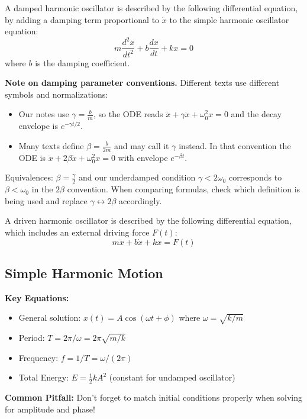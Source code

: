 \documentclass[11pt]{report}
\begin{document}
\begin{definition}
    A damped harmonic oscillator is described by the following differential equation, by adding a damping term proportional to $\dot{x}$ to the simple harmonic oscillator equation:
    \begin{equation} \label{eq:damped_ho}
        m \frac{d^2 x}{dt^2} + b \frac{dx}{dt} + kx = 0   
    \end{equation}
    where \( b \) is the damping coefficient.
\end{definition}

\begin{shaded}
	\textbf{Note on damping parameter conventions.} Different texts use different symbols and normalizations:
\begin{itemize}
    \item Our notes use $\gamma = \tfrac{b}{m}$, so the ODE reads $\ddot{x} + \gamma\dot{x} + \omega_0^2 x = 0$ and the decay envelope is $e^{-\gamma t/2}$.
    \item Many texts define $\beta = \tfrac{b}{2m}$ and may call it $\gamma$ instead. In that convention the ODE is $\ddot{x} + 2\beta\dot{x} + \omega_0^2 x = 0$ with envelope $e^{-\beta t}$.
\end{itemize}
Equivalences: $\beta = \tfrac{\gamma}{2}$ and our underdamped condition $\gamma < 2\omega_0$ corresponds to $\beta < \omega_0$ in the $2\beta$ convention. When comparing formulas, check which definition is being used and replace $\gamma \leftrightarrow 2\beta$ accordingly.
\end{shaded}

\begin{definition}
    A driven harmonic oscillator is described by the following differential equation, which includes an external driving force $F(t)$:
    \begin{equation}\label{eq:driven_ho}
        m \ddot{x} + b \dot{x} + kx = F(t)
    \end{equation}
\end{definition}

\subsection{Simple Harmonic Motion}

\begin{keybox}
\textbf{Key Equations:}
\begin{itemize}
    \item General solution: $x(t) = A\cos(\omega t + \phi)$ where $\omega = \sqrt{k/m}$
    \item Period: $T = 2\pi/\omega = 2\pi\sqrt{m/k}$
    \item Frequency: $f = 1/T = \omega/(2\pi)$
    \item Total Energy: $E = \frac{1}{2}kA^2$ (constant for undamped oscillator)
\end{itemize}
\textbf{Common Pitfall:} Don't forget to match initial conditions properly when solving for amplitude and phase!
\end{keybox}
\end{document}
